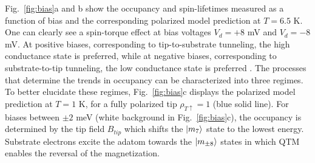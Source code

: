 \documentclass[
reprint,amsmath,amssymb,aps]{revtex4-2}
\begin{document}
Fig.~\ref{fig:bias}a and b show the occupancy and spin-lifetimes measured as a function of bias and the corresponding polarized model prediction at $T=6.5$ K. One can clearly see a spin-torque effect at bias voltages $V_d=+8 $ mV and $V_d=-8 $ mV. At  positive biases, corresponding to tip-to-substrate tunneling, the high conductance state is preferred, while at negative biases, corresponding to substrate-to-tip tunneling, the low conductance state is preferred \cite{Khajetoorians2013,delgadoSpinTransferTorqueSingle2010,balashovInelasticElectronmagnonInteraction2008,krause_joule_2011}. The processes that determine the trends in occupancy can be characterized into three regimes. To better elucidate these regimes, Fig.~\ref{fig:bias}c displays the polarized model prediction at $T=1$ K, for a fully polarized tip $\rho_{T \uparrow} = 1 $ (blue solid line). For biases between $\pm 2$ meV (white background in Fig.~\ref{fig:bias}c), the occupancy is determined by the tip field $B_{tip}$ which shifts the $\ket{m_{7}}$ state to the lowest energy. Substrate electrons excite the adatom towards the $\ket{m_{\pm8}}$ states in which QTM enables the reversal of the magnetization.
\end{document}
